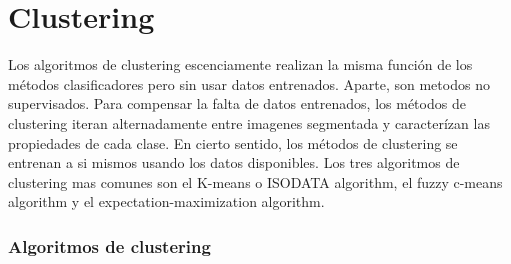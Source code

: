 \documentclass[12pt]{report}
\begin{document}
\section{Clustering}
Los algoritmos de clustering escenciamente realizan la misma función de los métodos clasificadores pero sin usar datos entrenados. Aparte, son metodos no supervisados. Para compensar la falta de datos entrenados, los métodos de clustering iteran alternadamente entre imagenes segmentada y caracterízan las propiedades de cada clase. En cierto sentido, los métodos de clustering se entrenan a si mismos usando los datos disponibles.
Los tres algoritmos de clustering mas comunes son el K-means o ISODATA algorithm, el fuzzy c-means algorithm y el expectation-maximization algorithm.\cite{split}

\subsubsection{Algoritmos de clustering}
\end{document}
